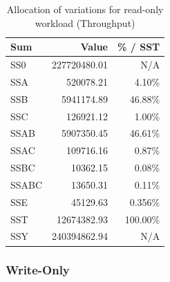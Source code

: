 \documentclass[11pt,a4paper]{article}
\begin{document}
\begin{table}[!htb]
  \centering
    \caption{Allocation of variations for read-only workload (Throughput)}
  \label{tab:ro_variation}
  \small{
    \begin{tabular}{|l|r|r|}
        \hline \textbf{Sum}   & \textbf{Value}        & \textbf{\% / SST} \\
      \hline SS0   & 227720480.01 & N/A      \\
      \hline SSA   & 520078.21    & 4.10\%  \\
      \hline SSB   & 5941174.89   & 46.88\% \\
      \hline SSC   & 126921.12    & 1.00\% \\
      \hline SSAB  & 5907350.45   & 46.61\%  \\
      \hline SSAC  & 109716.16    & 0.87\%  \\
      \hline SSBC  & 10362.15     & 0.08\%  \\
      \hline SSABC & 13650.31     & 0.11\%  \\
      \hline SSE   & 45129.63     & 0.356\%  \\
      \hline SST   & 12674382.93  & 100.00\% \\
      \hline SSY   & 240394862.94 & N/A      \\
      \hline
    \end{tabular}
  }
\end{table}


\newpage
\subsubsection*{Write-Only}
\end{document}
